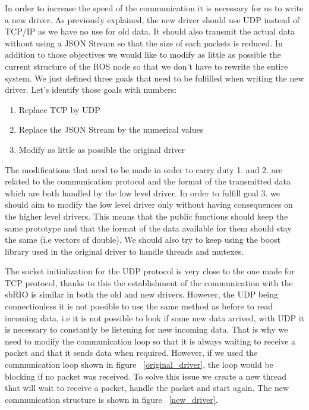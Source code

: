 In order to increase the speed of the communication it is necessary for us to write a new driver. As previously explained, the new driver should use UDP instead of TCP/IP as we have no use for old data. It should also transmit the actual data without using a JSON Stream so that the size of each packets is reduced. In addition to those objectives we would like to modify as little as possible the current structure of the ROS node so that we don't have to rewrite the entire system. 
We just defined three goals that need to be fulfilled when writing the new driver. Let's identify those goals with numbers:
\begin{enumerate}
	\item Replace TCP by UDP
	\item Replace the JSON Stream by the numerical values
	\item Modify as little as possible the original driver
\end{enumerate}

The modifications that need to be made in order to carry duty 1. and 2. are related to the communication protocol and the format of the transmitted data which are both handled by the low level driver. In order to fulfill goal 3. we should aim to modify the low level driver only without having consequences on the higher level drivers. This means that the public functions should keep the same prototype and that the format of the data available for them should stay the same (i.e vectors of double). We should also try to keep using the boost library used in the original driver to handle threads and mutexes.

The socket initialization for the UDP protocol is very close to the one made for TCP protocol, thanks to this the establishment of the communication with the sbRIO is similar in both the old and new drivers. However, the UDP being connectionless it is not possible to use the same method as before to read incoming data, i.e it is not possible to look if some new data arrived, with UDP it is necessary to constantly be listening for new incoming data. That is why we need to modify the communication loop so that it is always waiting to receive a packet and that it sends data when required. However, if we used the communication loop shown in figure ~\ref{original_driver}, the loop would be blocking if no packet was received. To solve this issue we create a new thread that will wait to receive a packet, handle the packet and start again. The new communication structure is shown in figure ~\ref{new_driver}.

